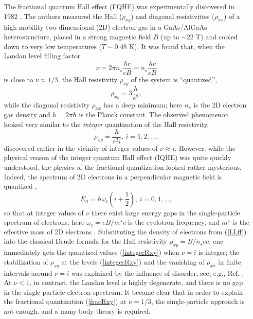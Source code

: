 \documentclass[aps,prb,10pt%
]{revtex4-2}
\def\be{\begin{equation}}
\def\ee{\end{equation}}
\begin{document}
The fractional quantum Hall effect (FQHE) was experimentally discovered in 1982 \cite{Tsui82}. The authors measured the Hall ($\rho_{xy}$) and diagonal resistivities ($\rho_{xx}$) of a high-mobility two-dimensional (2D) electron gas in a GaAs/AlGaAs heterostructure, placed in a strong magnetic field $B$ (up to $\sim 22$ T) and cooled down to very low temperatures ($T\sim 0.48$ K). It was found that, when the Landau level filling factor 
\be 
\nu=2\pi n_s\frac{\hbar c}{eB}=n_s\frac{h c}{eB}\label{LLff}
\ee
is close to $\nu\approx 1/3$, the Hall resistivity $\rho_{xy}$ of the system is ``quantized'',
\be 
\rho_{xy}= 3\frac h{e^2},\label{fracRxy}
\ee
while the diagonal resistivity $\rho_{xx}$ has a deep minimum; here $n_s$ is the 2D electron gas density and $h=2\pi\hbar$ is the Planck constant. The observed phenomenon looked very similar to the \textit{integer} quantization of the Hall resistivity, 
\be 
\rho_{xy}= \frac h{e^2i},\ i=1,2,\dots,\label{integerRxy}
\ee
discovered earlier \cite{Klitzing80} in the vicinity of integer values of $\nu\approx i$. However, while the physical reason of the integer quantum Hall effect (IQHE) was quite quickly understood, the physics of the fractional quantization looked rather mysterious. Indeed, the spectrum of 2D electrons in a perpendicular magnetic field is quantized \cite{Landau30},
\be 
E_n=\hbar\omega_c\left(i+\frac 12\right), \ i=0, 1,\dots,
\ee
so that at integer values of $\nu$ there exist large energy gaps in the single-particle spectrum of electrons; here $\omega_c=eB/m^\star c$ is the cyclotron frequency, and $m^\star$ is the effective mass of 2D electrons . Substituting the density of electrons from (\ref{LLff}) into the classical Drude formula for the Hall resistivity $\rho_{xy}=B/n_sec$, one immediately gets the quantized values (\ref{integerRxy}) when $\nu=i$ is integer; the stabilization of $\rho_{xy}$ at the levels  (\ref{integerRxy}) and the vanishing of $\rho_{xx}$ in finite intervals around $\nu=i$ was explained by the influence of disorder, see, e.g., Ref. \cite{Prange90}. At $\nu<1$, in contrast, the Landau level is highly degenerate, and there is no gap in the single-particle electron spectrum. It became clear that in order to explain the fractional quantization (\ref{fracRxy}) at $\nu=1/3$, the single-particle approach is not enough, and a many-body theory is required.
\end{document}
